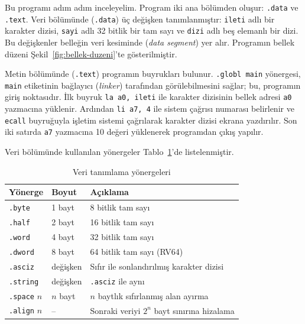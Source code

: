 Bu programı adım adım inceleyelim. Program iki ana bölümden oluşur: \texttt{.data} ve \texttt{.text}. Veri bölümünde (\texttt{.data}) üç değişken tanımlanmıştır: \texttt{ileti} adlı bir karakter dizisi, \texttt{sayi} adlı 32 bitlik bir tam sayı ve \texttt{dizi} adlı beş elemanlı bir dizi. Bu değişkenler belleğin veri kesiminde (\emph{data segment}) yer alır. Programın bellek düzeni Şekil~\ref{fig:bellek-duzeni}'te gösterilmiştir.

Metin bölümünde (\texttt{.text}) programın buyrukları bulunur. \texttt{.globl main} yönergesi, \texttt{main} etiketinin bağlayıcı (\emph{linker}) tarafından görülebilmesini sağlar; bu, programın giriş noktasıdır. İlk buyruk \texttt{la a0, ileti} ile karakter dizisinin bellek adresi \texttt{a0} yazmacına yüklenir. Ardından \texttt{li a7, 4} ile sistem çağrısı numarası belirlenir ve \texttt{ecall} buyruğuyla işletim sistemi çağrılarak karakter dizisi ekrana yazdırılır. Son iki satırda \texttt{a7} yazmacına 10 değeri yüklenerek programdan çıkış yapılır.

Veri bölümünde kullanılan yönergeler Tablo~\ref{tab:veri-yonergeleri}'de listelenmiştir.

\begin{table}[H]
\centering
\caption{Veri tanımlama yönergeleri}
\label{tab:veri-yonergeleri}
\small
\begin{tabularx}{\textwidth}{l l X}
\toprule
\textbf{Yönerge} & \textbf{Boyut} & \textbf{Açıklama} \\
\midrule
\texttt{.byte} & 1 bayt & 8 bitlik tam sayı \\
\texttt{.half} & 2 bayt & 16 bitlik tam sayı \\
\texttt{.word} & 4 bayt & 32 bitlik tam sayı \\
\texttt{.dword} & 8 bayt & 64 bitlik tam sayı (RV64) \\
\texttt{.asciz} & değişken & Sıfır ile sonlandırılmış karakter dizisi \\
\texttt{.string} & değişken & \texttt{.asciz} ile aynı \\
\texttt{.space} $n$ & $n$ bayt & $n$ baytlık sıfırlanmış alan ayırma \\
\texttt{.align} $n$ & -- & Sonraki veriyi $2^n$ bayt sınırına hizalama \\
\bottomrule
\end{tabularx}
\end{table}

